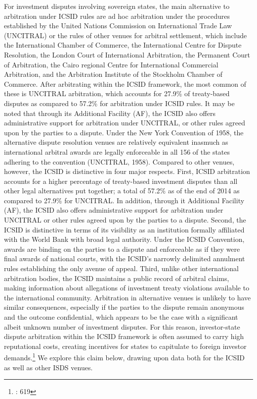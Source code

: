 \documentclass[12pt,onesided]{amsart}
\begin{document}
For investment disputes involving sovereign states, the main alternative to arbitration under ICSID rules are ad hoc arbitration under the procedures established by the United Nations Commission on International Trade Law (UNCITRAL) or the rules of other venues for arbitral settlement, which include the International Chamber of Commerce, the International Centre for Dispute Resolution, the London Court of International Arbitration, the Permanent Court of Arbitration, the Cairo regional Centre for International Commercial Arbitration, and the Arbitration Institute of the Stockholm Chamber of Commerce. After arbitrating within the ICSID framework, the most common of these is UNCITRAL arbitration, which accounts for 27.9\% of treaty-based disputes as compared to 57.2\% for arbitration under ICSID rules. It may be noted that through its Additional Facility (AF), the ICSID also offers administrative support for arbitration under UNCITRAL, or other rules agreed upon by the parties to a dispute. Under the New York Convention of 1958, the alternative dispute resolution venues are relatively equivalent inasmuch as international arbitral awards are legally enforceable in all 156 of the states adhering to the convention (UNCITRAL, 1958). Compared to other venues, however, the ICSID is distinctive in four major respects. First, ICSID arbitration accounts for a higher percentage of treaty-based investment disputes than all other legal alternatives put together; a total of 57.2\% as of the end of 2014 as compared to 27.9\% for UNCITRAL. In addition, through it Additional Facility (AF), the ICSID also offers administrative support for arbitration under UNCITRAL or other rules agreed upon by the parties to a dispute. Second, the  ICSID is distinctive in terms of its visibility as an institution formally affiliated with the World Bank with broad legal authority. Under the ICSID Convention, awards are binding on the parties to a dispute and enforceable as if they were final awards of national courts, with the ICSID's narrowly delimited annulment rules establishing the only avenue of appeal. Third, unlike other international arbitration bodies, the ICSID maintains a public record of arbitral claims, making information about allegations of investment treaty violations available to the international community. Arbitration in alternative venues is unlikely to have similar consequences, especially if the parties to the dispute remain anonymous and the outcome confidential, which appears to be the case with a significant albeit unknown number of investment disputes. For this reason, investor-state dispute arbitration within the ICSID framework is often assumed to carry high reputational costs, creating incentives for states to capitulate to foreign investor demands.\footnote{\citet{trakman:2013}: 619}  We explore this claim below, drawing upon data both for the ICSID as well as other ISDS venues.
\end{document}
